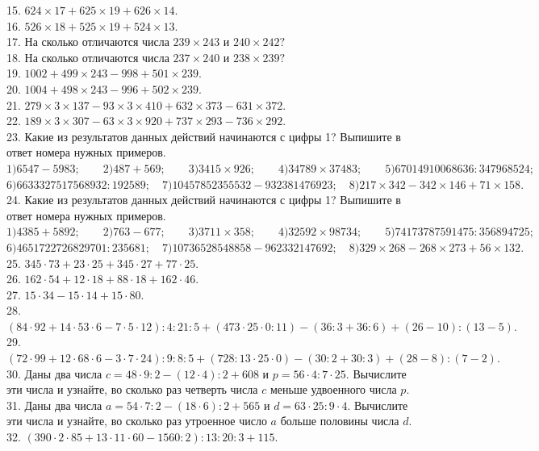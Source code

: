\documentclass[12pt]{article}
\begin{document}
15. $624\times17+625\times 19+626\times14.$\\
16. $526\times18+525\times19+524\times13.$\\
17. На сколько отличаются числа $239\times243$ и $240\times242?$\\
18. На сколько отличаются числа $237\times240$ и $238\times239?$\\
19. $1002+499\times243-998+501\times239.$\\
20. $1004+498\times243-996+502\times239.$\\
21. $279\times3\times137-93\times3\times410+632\times373-631\times372.$\\
22. $189\times3\times307-63\times3\times920+737\times293-736\times292.$\\
23. Какие из результатов данных действий начинаются с цифры 1? Выпишите в ответ номера нужных примеров.\\
$1)6547-5983;\qquad 2)487+569;\qquad 3)3415\times926;\qquad 4)34789\times37483;\qquad5) 67014910068636:347968524;$
$6)6633327517568932:192589;\quad7)10457852355532-932381476923;\quad8)217\times342-342\times146+71\times158.$\\
24. Какие из результатов данных действий начинаются с цифры 1? Выпишите в ответ номера нужных примеров.\\
$1)4385+5892;\qquad 2)763-677;\qquad 3)3711\times358;\qquad4)32592\times98734;\qquad5) 74173787591475:356894725;$
$6)4651722726829701:235681;\quad7)10736528548858-962332147692;\quad8)329\times268-268\times273+56\times132.$\\
25. $345\cdot73 + 23\cdot25 + 345\cdot27 + 77\cdot25.$\\
26. $162\cdot54+12\cdot18 + 88\cdot18+ 162\cdot46.$\\
27. $15\cdot34-15\cdot14+15\cdot80.$\\
28. $(84\cdot92+14\cdot53\cdot6-7\cdot5\cdot12):4:21:5+(473\cdot25\cdot0:11)-(36:3+36:6)+(26-10):(13-5).$\\
29. $(72\cdot99+12\cdot68\cdot6-3\cdot7\cdot24):9:8:5+(728:13\cdot25\cdot0)-(30:2+30:3)+(28-8):(7-2).$\\
30. Даны два числа $c=48\cdot9:2-(12\cdot4):2+608$ и $p=56\cdot4:7\cdot25.$ Вычислите эти числа и узнайте, во сколько раз четверть числа $c$ меньше удвоенного числа $p.$\\
31. Даны два числа $a=54\cdot7:2-(18\cdot6):2+565$ и $d=63\cdot25:9\cdot4.$ Вычислите эти числа и узнайте, во сколько раз утроенное число $a$ больше половины числа $d.$\\
32. $(390\cdot2\cdot85+13\cdot11\cdot60-1560:2):13:20:3+115.$\\
\end{document}

